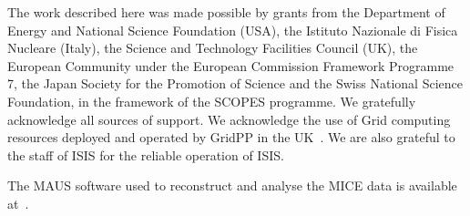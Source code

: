 The work described here was made possible by grants from the Department of Energy and National Science Foundation (USA), the Istituto Nazionale di Fisica Nucleare (Italy), 
the Science and Technology Facilities Council (UK), the European Community under the European Commission Framework Programme 7, the Japan Society for the Promotion of 
Science and the Swiss National Science Foundation, in the framework of the SCOPES programme. We gratefully acknowledge all sources of support.
We acknowledge the use of Grid computing resources deployed and operated by GridPP in the UK~\cite{grid_pp_2009}. We are also grateful to the staff of ISIS for the reliable operation of ISIS.

The MAUS software used to reconstruct and analyse the MICE data is available at~\cite{MICE_code}.
